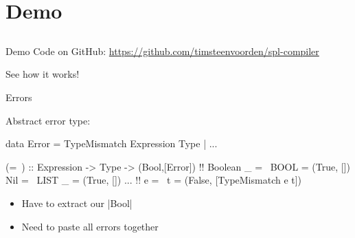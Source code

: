 \section{Demo}
\subsection*{}

\begin{frame}{Demo}
  Code on GitHub: \url{https://github.com/timsteenvoorden/spl-compiler}

  \bigskip

  See how it works!
\end{frame}

\appendix

\begin{frame}[fragile]{Errors}

  Abstract error type:

    \begin{HASKELL}
      data Error = TypeMismatch Expression Type | ...
    \end{HASKELL}
  
  \pause

  \begin{block}{}
    \begin{HASKELL}
      (=~) :: Expression -> Type -> (Bool,[Error]) !\pause!
      Boolean _ =~ BOOL   = (True, [])
      Nil       =~ LIST _ = (True, [])
      ... !\pause!
      e         =~ t      = (False, [TypeMismatch e t])
    \end{HASKELL}
  \end{block}

  \pause

  \begin{itemize}
    \item Have to extract our |Bool| \frownie
    \item Need to paste all errors together \frownie
  \end{itemize}

\end{frame}

